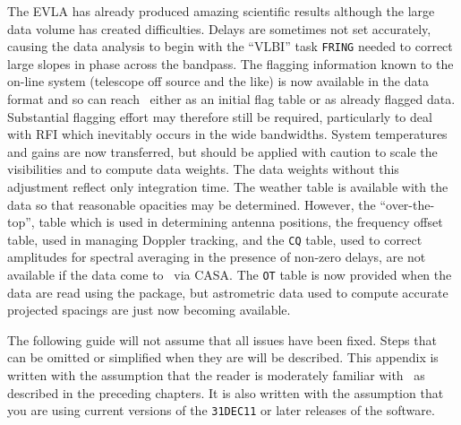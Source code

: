 The EVLA has already produced amazing scientific results although the
large data volume has created difficulties.  Delays are sometimes not
set accurately, causing the data analysis to begin with the ``VLBI''
task {\tt FRING} needed to correct large slopes in phase across the
bandpass.  The flagging information known to the on-line system
(telescope off source and the like) is now available in the data
format and so can reach \AIPS\ either as an initial flag table or as
already flagged data.  Substantial flagging effort may therefore still
be required, particularly to deal with RFI which inevitably occurs in
the wide bandwidths.  System temperatures and gains are now
transferred, but should be applied with caution to scale the
visibilities and to compute data weights.  The data weights without
this adjustment reflect only integration time.  The weather table is
available with the data so that reasonable opacities may be determined.
However, the ``over-the-top'', table which is used in determining
antenna positions, the frequency offset table, used in managing
Doppler tracking, and the {\tt CQ} table, used to correct amplitudes
for spectral averaging in the presence of non-zero delays, are not
available if the data come to \AIPS\ via CASA\@.  The {\tt OT} table
is now provided when the data are read using the {\tt {}}
package, but astrometric data used to compute accurate projected
spacings are just now becoming available.

The following guide will not assume that all issues have been fixed.
Steps that can be omitted or simplified when they are will be
described.  This appendix is written with the assumption that the
reader is moderately familiar with \AIPS\ as described in the
preceding chapters.  It is also written with the assumption that you
are using current versions of the {\tt 31DEC11} or later releases of
the software.


